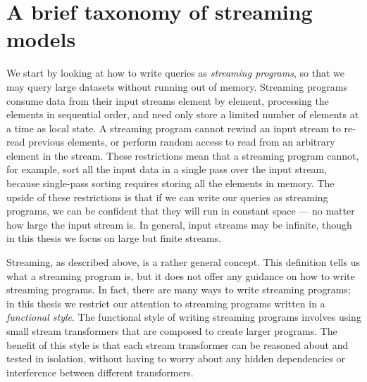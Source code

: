 \chapter{A brief taxonomy of streaming models}
\label{taxonomy}

We start by looking at how to write queries as \emph{streaming programs}, so that we may query large datasets without running out of memory.
Streaming programs consume data from their input streams element by element, processing the elements in sequential order, and need only store a limited number of elements at a time as local state.
A streaming program cannot rewind an input stream to re-read previous elements, or perform random access to read from an arbitrary element in the stream.
These restrictions mean that a streaming program cannot, for example, sort all the input data in a single pass over the input stream, because single-pass sorting requires storing all the elements in memory.
The upside of these restrictions is that if we can write our queries as streaming programs, we can be confident that they will run in constant space --- no matter how large the input stream is.
In general, input streams may be infinite, though in this thesis we focus on large but finite streams.


Streaming, as described above, is a rather general concept.
This definition tells us what a streaming program is, but it does not offer any guidance on how to write streaming programs.
In fact, there are many ways to write streaming programs; in this thesis we restrict our attention to streaming programs written in a \emph{functional style}.
The functional style of writing streaming programs involves using small stream transformers that are composed to create larger programs.
The benefit of this style is that each stream transformer can be reasoned about and tested in isolation, without having to worry about any hidden dependencies or interference between different transformers.

